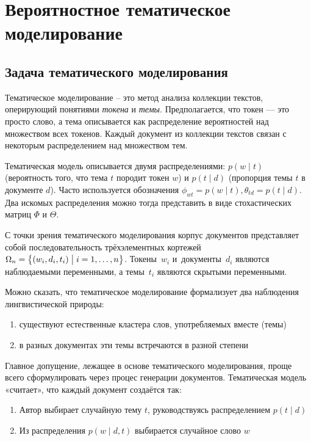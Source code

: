 \chapter{Вероятностное тематическое моделирование}

\section{Задача тематического моделирования}

Тематическое моделирование – это метод анализа коллекции текстов, оперирующий понятиями \textit{токена} и \textit{темы}. Предполагается, что токен --– это просто слово, а тема описывается как распределение вероятностей над множеством всех токенов. Каждый документ из коллекции текстов связан с некоторым распределением над множеством тем.


Тематическая модель описывается двумя распределениями: $p(w \mid t)$ (вероятность того, что тема $t$ породит токен $w$) и $p(t \mid d)$ (пропорция темы $t$ в документе $d$). Часто используется обозначения $\phi_{wt} = p(w \mid t), \theta_{td} = p(t \mid d)$. Два искомых распределения можно тогда представить в виде стохастических матриц $\Phi$ и $\Theta$. 

С точки зрения тематического моделирования корпус документов представляет собой последовательность трёхэлементных кортежей ${\Omega_n = \bigl\{ (w_i,d_i,t_i) \bigm| i=1,\dots,n \bigr\}}$.
Токены~$w_i$ и~документы~$d_i$ являются наблюдаемыми переменными,
а темы~$t_i$ являются скрытыми переменными.

Можно сказать, что тематическое моделирование формализует два наблюдения лингвистической природы: 
\begin{enumerate}
\item{существуют естественные кластера слов, употребляемых вместе (темы)}
\item{в разных документах эти темы встречаются в разной степени}
\end{enumerate}

Главное допущение, лежащее в основе тематического моделирования, проще всего сформулировать через процес генерации документов. Тематическая модель «считает», что каждый документ создаётся так: 
\begin{enumerate}
    \item{Автор выбирает случайную тему $t$, руководствуясь распределением $p(t \mid d)$}
    \item{Из распределения $p(w \mid d, t)$ выбирается случайное слово $w$}
\end{enumerate}

